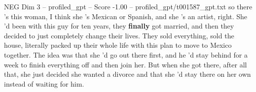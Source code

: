 \begin{textsample}{NEG Dim 3 – profiled\_gpt – Score -1.00 – profiled\_gpt/t001587\_gpt.txt}  \label{ex:f3_neg_028}
so there ’s this woman, I think she ’s Mexican or Spanish, and she ’s an artist, right.
She ’d been with this guy for ten years, they \textbf{finally} got married, and then they decided to just completely change their lives.
They sold everything, sold the house, literally packed up their whole life with this plan to move to Mexico together.
The idea was that she ’d go out there first, and he ’d stay behind for a week to finish everything off and then join her.
But when she got there, after all that, she just decided she wanted a divorce and that she ’d stay there on her own instead of waiting for him.

\end{textsample}
